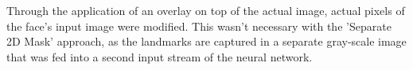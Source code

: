 \noindent Through the application of an overlay on top of the actual image, actual pixels of the face's input image were modified. This wasn't necessary with the 'Separate 2D Mask' approach, as the landmarks are captured in a separate gray-scale image that was fed into a second input stream of the neural network.\newline

\begin{figure}[htbp]
  \begin{center}
  \hfill
  \hfill
  \hfill

\end{center}
\end{figure}
